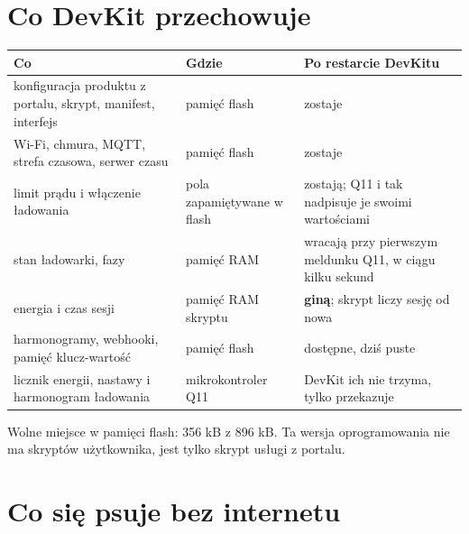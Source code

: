 \documentclass[11pt,a4paper]{article}
\begin{document}
\section{Co DevKit przechowuje}

\begin{longtable}{>{\raggedright\arraybackslash}p{6.75cm}>{\raggedright\arraybackslash}p{2.76cm}>{\raggedright\arraybackslash}p{5.77cm}}
\toprule
\rowcolor{apteallight}\textbf{Co} & \textbf{Gdzie} & \textbf{Po restarcie DevKitu} \\
\midrule\endhead
\bottomrule\endfoot
konfiguracja produktu z portalu, skrypt, manifest, interfejs & pamięć flash & zostaje \\
Wi-Fi, chmura, MQTT, strefa czasowa, serwer czasu & pamięć flash & zostaje \\
limit prądu i włączenie ładowania & pola zapamiętywane w flash & zostają; Q11 i tak nadpisuje je swoimi wartościami \\
stan ładowarki, fazy & pamięć RAM & wracają przy pierwszym meldunku Q11, w ciągu kilku sekund \\
energia i czas sesji & pamięć RAM skryptu & \textbf{giną}; skrypt liczy sesję od nowa \\
harmonogramy, webhooki, pamięć klucz-wartość & pamięć flash & dostępne, dziś puste \\
licznik energii, nastawy i harmonogram ładowania & mikrokontroler Q11 & DevKit ich nie trzyma, tylko przekazuje \\
\end{longtable}

Wolne miejsce w pamięci flash: 356 kB z 896 kB. Ta wersja oprogramowania nie ma skryptów użytkownika, jest tylko skrypt usługi z portalu.


\section{Co się psuje bez internetu}
\end{document}
